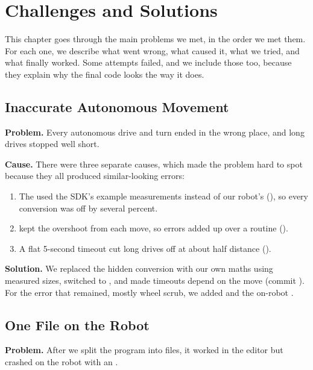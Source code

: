 \chapter{Challenges and Solutions}
\label{ch:challenges}

This chapter goes through the main problems we met, in the order we met them.
For each one, we describe what went wrong, what caused it, what we tried, and
what finally worked. Some attempts failed, and we include those too, because
they explain why the final code looks the way it does.

\section{Inaccurate Autonomous Movement}
\label{sec:ch-geometry}

\textbf{Problem.} Every autonomous drive and turn ended in the wrong place, and
long drives stopped well short.

\textbf{Cause.} There were three separate causes, which made the problem hard to
spot because they all produced similar-looking errors:

\begin{enumerate}
  \item The  used the SDK's example measurements instead of our
    robot's (), so every conversion was off by several
    percent.
  \item {} kept the overshoot from each move, so errors added up over a
    routine ().
  \item A flat 5-second timeout cut long drives off at about half distance
    ().
\end{enumerate}

\textbf{Solution.} We replaced the hidden conversion with our own maths using
measured sizes, switched to , and made timeouts depend on the move
(commit ). For the error that remained, mostly wheel scrub, we
added  and the on-robot .

\section{One File on the Robot}
\label{sec:ch-onefile}

\textbf{Problem.} After we split the program into files, it worked in the editor
but crashed on the robot with an .

